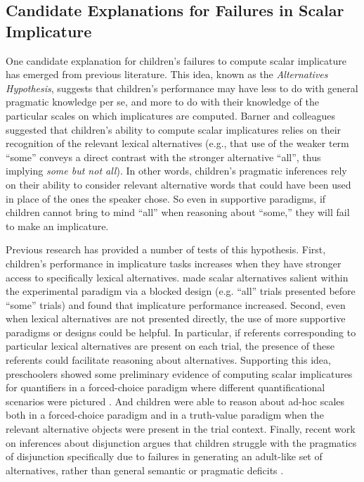 \documentclass[man]{apa2}
\begin{document}
\subsection{Candidate Explanations for Failures in Scalar Implicature}

One candidate explanation for children's failures to compute scalar implicature has emerged from previous literature. This idea, known as the \emph{Alternatives Hypothesis}, suggests that children's performance may have less to do with general pragmatic knowledge per se, and more to do with their knowledge of the particular scales on which implicatures are computed. Barner and colleagues \cite{barner2010,barner2011} suggested that children's ability to compute scalar implicatures relies on their recognition of the relevant lexical alternatives (e.g., that use of the weaker term ``some'' conveys a direct contrast with the stronger alternative ``all'', thus implying \emph{some but not all}).  In other words, children's pragmatic inferences rely on their ability to consider relevant alternative words that could have been used in place of the ones the speaker chose. So even in supportive paradigms, if children cannot bring to mind ``all'' when reasoning about ``some,'' they will fail to make an implicature.

Previous research has provided a number of tests of this hypothesis. First,  children's performance in implicature tasks increases when they have stronger access to specifically lexical alternatives.  made scalar alternatives salient within the experimental paradigm via a blocked design (e.g. ``all'' trials presented before ``some'' trials) and found that implicature performance increased. Second, even when lexical alternatives are not presented directly, the use of more supportive paradigms or designs could be helpful. In particular, if referents corresponding to particular lexical alternatives are present on each trial, the presence of these referents could facilitate reasoning about alternatives. Supporting this idea, preschoolers showed some preliminary evidence of computing scalar implicatures for quantifiers in a forced-choice paradigm where different quantificational scenarios were pictured \cite{miller2005}. And children were able to reason about ad-hoc scales both in a forced-choice paradigm \cite{stiller2015} and in a truth-value paradigm \cite{barner2011} when the relevant alternative objects were present in the trial context. Finally, recent work on inferences about disjunction argues that children struggle with the pragmatics of disjunction specifically due to failures in generating an adult-like set of alternatives, rather than general semantic or pragmatic deficits \cite{singh2016,tieu2016}.
\end{document}

